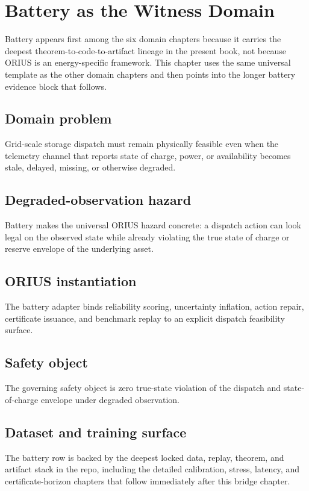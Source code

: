 \chapter{Battery as the Witness Domain}
\label{ch:battery-bridge}
\label{ch:battery-to-orius}

Battery appears first among the six domain chapters because it carries the deepest
theorem-to-code-to-artifact lineage in the present book, not because ORIUS is an
energy-specific framework.  This chapter uses the same universal template as the other
domain chapters and then points into the longer battery evidence block that follows.

\section{Domain problem}
Grid-scale storage dispatch must remain physically feasible even when the telemetry channel
that reports state of charge, power, or availability becomes stale, delayed, missing, or
otherwise degraded.

\section{Degraded-observation hazard}
Battery makes the universal ORIUS hazard concrete: a dispatch action can look legal on the
observed state while already violating the true state of charge or reserve envelope of the
underlying asset.

\section{ORIUS instantiation}
The battery adapter binds reliability scoring, uncertainty inflation, action repair,
certificate issuance, and benchmark replay to an explicit dispatch feasibility surface.

\section{Safety object}
The governing safety object is zero true-state violation of the dispatch and state-of-charge
envelope under degraded observation.

\section{Dataset and training surface}
The battery row is backed by the deepest locked data, replay, theorem, and artifact stack
in the repo, including the detailed calibration, stress, latency, and certificate-horizon
chapters that follow immediately after this bridge chapter.

